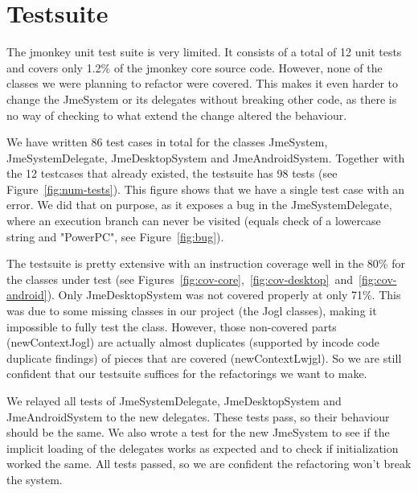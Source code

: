 \documentclass[a4paper, 10pt]{article}
\begin{document}
\section{Testsuite}
\label{sec:testsuite}
The jmonkey unit test suite is very limited.
It consists of a total of 12 unit tests and covers only 1.2\% of the jmonkey core source code.
However, none of the classes we were planning to refactor were covered.
This makes it even harder to change the JmeSystem or its delegates without breaking other code,
as there is no way of checking to what extend the change altered the behaviour.

We have written 86 test cases in total for the classes JmeSystem, JmeSystemDelegate, JmeDesktopSystem and JmeAndroidSystem.
Together with the 12 testcases that already existed, the testsuite has 98 tests (see Figure~\ref{fig:num-tests}).
This figure shows that we have a single test case with an error.
We did that on purpose, as it exposes a bug in the JmeSystemDelegate, 
where an execution branch can never be visited (equals check of a lowercase string and "PowerPC", see Figure~\ref{fig:bug}).

The testsuite is pretty extensive with an instruction coverage well in the 80\% for the classes under test (see Figures~\ref{fig:cov-core},~\ref{fig:cov-desktop}~and~\ref{fig:cov-android}).
Only JmeDesktopSystem was not covered properly at only 71\%. 
This was due to some missing classes in our project (the Jogl classes),
making it impossible to fully test the class. 
However, those non-covered parts (newContextJogl) are actually almost duplicates (supported by incode code duplicate findings) of pieces that are covered (newContextLwjgl).
So we are still confident that our testsuite suffices for the refactorings we want to make.

We relayed all tests of JmeSystemDelegate, JmeDesktopSystem and JmeAndroidSystem to the new delegates.
These tests pass, so their behaviour should be the same.
We also wrote a test for the new JmeSystem to see if the implicit loading of the delegates works as expected and to check if initialization worked the same.
All tests passed, so we are confident the refactoring won't break the system.
\end{document}
